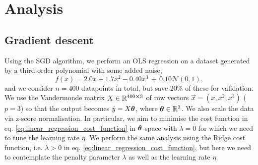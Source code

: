 \section{Analysis}\label{sec:analysis}






\subsection{Gradient descent}\label{sec:analysis_SGD}


    Using the SGD algorithm, we perform an OLS regression on a dataset generated by a third order polynomial with some added noise,
    \begin{equation}
        f(x) = 2.0x + 1.7x^2 -0.40x^3 \, +\, 0.10\mathcal{N}(0, 1),
    \end{equation}
    and we consider $n=400$ datapoints in total, but save 20\% of these for validation. We use the Vandermonde matrix $X\in \RR[400 \cross 3]$ of row vectors $\vec{x} = (x, x^2, x^3)$ ($p=3$) so that the output becomes $\hat{y} = X\svec{\theta}$, where $\svec{\theta}\in \RR[3]$. We also scale the data via z-score normalisation. In particular, we aim to minimise the cost function in eq. \eqref{eq:linear_regression_cost_function} in $\svec{\theta}$-space with $\lambda=0$ for which we need to tune the learning rate $\eta$. We perform the same analysis using the Ridge cost function, i.e. $\lambda > 0$ in eq. \eqref{eq:linear_regression_cost_function}, but here we need to contemplate the penalty parameter $\lambda$ as well as the learning rate $\eta$.

